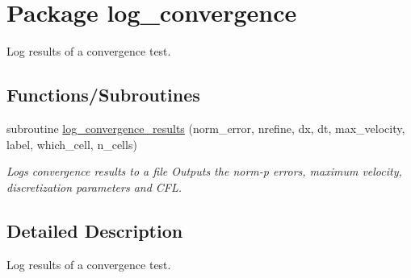 \hypertarget{a00064}{
\section{Package log\_\-convergence}
\label{a00064}
}
Log results of a convergence test.  


\subsection*{Functions/Subroutines}
\begin{CompactItemize}
\item 
\hypertarget{a00064_11b02a901a2b18281b2cd2b4cedb9c2f}{
subroutine \hyperlink{a00064_11b02a901a2b18281b2cd2b4cedb9c2f}{log\_\-convergence\_\-results} (norm\_\-error, nrefine, dx, dt, max\_\-velocity, label, which\_\-cell, n\_\-cells)}
\label{a00064_11b02a901a2b18281b2cd2b4cedb9c2f}

\begin{CompactList}\small\item\em Logs convergence results to a file Outputs the norm-p errors, maximum velocity, discretization parameters and CFL. \item\end{CompactList}\end{CompactItemize}


\subsection{Detailed Description}
Log results of a convergence test. 

